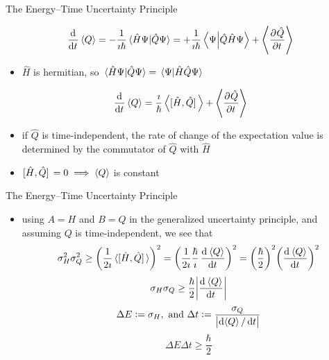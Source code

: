 \documentclass[ignorenonframetext,]{beamer}
\begin{document}
\begin{frame}{The Energy--Time Uncertainty Principle}

\[\dod{}{t} \expval{Q} =
  -\frac{1}{\imath\hbar} \braket*{\hat{H} \Psi}{\hat{Q} \Psi} =
  +\frac{1}{\imath\hbar} \braket{\Psi}{\hat{Q} \hat{H} \Psi}
  +\expval{\dpd{\hat{Q}}{t}}\]

\begin{itemize}
\itemsep1pt\parskip0pt
\item
  \(\hat{H}\) is hermitian, so
  \(\braket*{\hat{H} \Psi}{\hat{Q} \Psi} = \braket*{\Psi}{\hat{H}\Hat{Q}\Psi}\)
\end{itemize}

\[\dod{}{t} \expval{Q} =
  \frac{\imath}{\hbar} \expval{\comm*{\hat{H}}{\hat{Q}}}
+ \expval{\dpd{\hat{Q}}{t}}\]

\begin{itemize}
\itemsep1pt\parskip0pt
\item
  if \(\hat{Q}\) is time-independent, the rate of change of the
  expectation value is determined by the commutator of \(\hat{Q}\) with
  \(\hat{H}\)
\item
  \(\comm*{\hat{H}}{\hat{Q}} = 0 \implies \expval{Q}\) is constant
\end{itemize}

\end{frame}

\begin{frame}{The Energy--Time Uncertainty Principle}

\begin{itemize}
\itemsep1pt\parskip0pt
\item
  using \(A = H\) and \(B = Q\) in the generalized uncertainty
  principle, and assuming \(Q\) is time-independent, we see that
  \[\sigma_H^2 \sigma_Q^2 \geq
    \qty( \frac{1}{2 \imath} \expval*{\comm*{\hat{H}}{\hat{Q}}} )^2 =
    \qty( \frac{1}{2 \imath} \frac{\hbar}{\imath} \dod{\expval*{Q}}{t} )^2 =
    \qty( \frac{\hbar}{2} )^2 \qty( \dod{\expval*{Q}}{t} )^2\]
  \[\sigma_H \sigma_Q \geq \frac{\hbar}{2} \abs{\dod{\expval*{Q}}{t}}\]
  \[\Delta E := \sigma_H,
    \text{ and }
    \Delta t := \frac{\sigma_Q}{\abs{\dif\expval{Q}/\dif t}}\]
  \[\Delta E \Delta t \geq \frac{\hbar}{2}\]
\end{itemize}

\end{frame}
\end{document}
